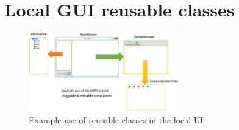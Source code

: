 \section{Local GUI reusable classes}
\label{sec:local-gui-reuse}

\begin{figure}[htb]
\centering
    \includegraphics[angle=270, width=0.58\textwidth]{Appendices/graphics/localuiplug&play.png}
    \caption{Example use of reusable classes in the local UI}
    \label{fig:local-gui-reuse-fig}
\end{figure}